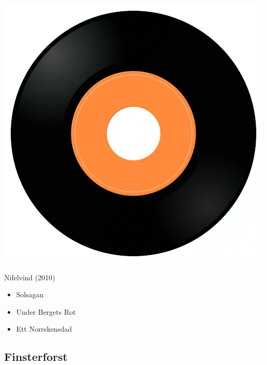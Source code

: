 \begin{minipage}[t]{0.25\textwidth}\vspace{0pt}
\captionsetup{type=figure}
\includegraphics[width=\textwidth]{Images/cover.png}
\caption*{Nifelvind (2010)}
\end{minipage}
\begin{minipage}[t]{0.25\textwidth}\vspace{0pt}
\begin{itemize}[nosep,leftmargin=1em,labelwidth=*,align=left]
	\setlength{\itemsep}{0pt}
	\item Solsagan
	\item Under Bergets Rot
	\item Ett Norrskensdad
\end{itemize}
\end{minipage}

\subsection{Finsterforst}

